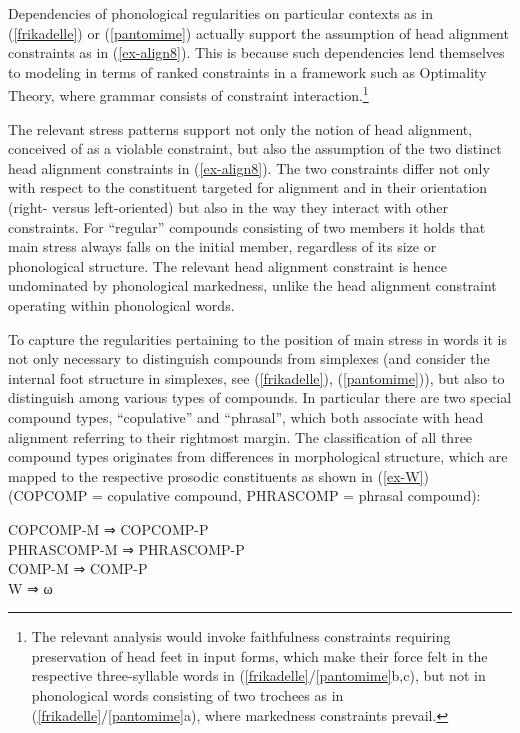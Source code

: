 \documentclass[output=paper
 ,nobabel
 ,draftmode
 ,colorlinks, citecolor=brown
]{langscibook}
\begin{document}
\noindent
Dependencies of phonological regularities on particular contexts as in (\ref{frikadelle}) or
(\ref{pantomime}) actually support the assumption of head alignment constraints as in
(\ref{ex-align8}). This is because such dependencies lend themselves to modeling in terms of ranked
constraints in a framework such as Optimality Theory, where grammar consists of constraint
interaction.\footnote{The relevant analysis would invoke faithfulness constraints requiring preservation of head feet in input forms, which make their force felt in the respective three-syllable words in (\ref{frikadelle}/\ref{pantomime}b,c), but not in phonological words consisting of two trochees as in (\ref{frikadelle}/\ref{pantomime}a), where markedness constraints prevail.} 

The relevant stress patterns support not only the notion of head alignment, conceived of as a violable constraint, but also the assumption of the two distinct head alignment constraints in (\ref{ex-align8}). The two constraints differ not only with respect to the constituent targeted for alignment and in their orientation (right- versus left-oriented) but also in the way they interact with other constraints. For ``regular'' compounds consisting of two members it holds that main stress always falls on the initial member, regardless of its size or phonological structure. The relevant head alignment constraint is hence undominated by phonological markedness, unlike the head alignment constraint operating within phonological words.  
    
\largerpage
To capture the regularities pertaining to the position of main stress in words it is not only necessary
to distinguish compounds from simplexes (and consider the internal foot structure in simplexes, see
(\ref{frikadelle}), (\ref{pantomime})), but also to distinguish among
various types of compounds. In particular there are two special compound types, ``copulative'' and
``phrasal'',  which both associate with head alignment referring to their rightmost margin. The
classification of all three compound types originates from differences in morphological structure,
which are mapped to the respective prosodic constituents as shown in (\ref{ex-W}) (COPCOMP =
copulative compound, PHRASCOMP = phrasal compound): 

\ea\label{ex-W}
COPCOMP-M ⇒ COPCOMP-P\\
PHRASCOMP-M ⇒ PHRASCOMP-P\\
COMP-M ⇒ COMP-P\\
W ⇒ ω\\
 \z
 
\end{document}
